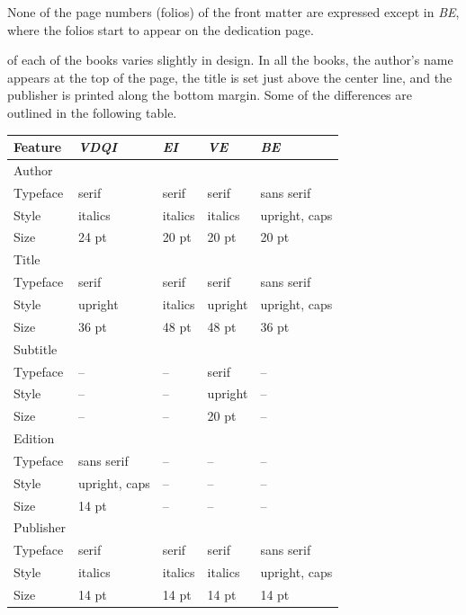 \documentclass[
  twoside,
  symmetric]{tufte-book}
\newcommand{\vdqi}{\textit{VDQI}\xspace}
\newcommand{\ei}{\textit{EI}\xspace}
\newcommand{\ve}{\textit{VE}\xspace}
\newcommand{\be}{\textit{BE}\xspace}
\newcommand{\na}{\quad--}
\begin{document}
None of the page numbers (folios) of the front matter are expressed
except in \be, where the folios start to appear on the dedication page.

 of each of the books varies slightly in
design. In all the books, the author's name appears at the top of the
page, the title is set just above the center line, and the publisher is
printed along the bottom margin. Some of the differences are outlined in
the following table.

\bigskip
\begin{center}
\footnotesize
\begin{tabular}{lllll}
\toprule
Feature & \vdqi & \ei & \ve & \be \\
\midrule
Author & & & & \\
\quad Typeface & serif   & serif   & serif   & sans serif \\
\quad Style    & italics & italics & italics & upright, caps \\
\quad Size     & 24 pt   & 20 pt   & 20 pt   & 20 pt \\
\addlinespace
Title & & & & \\
\quad Typeface & serif   & serif   & serif   & sans serif \\
\quad Style    & upright & italics & upright & upright, caps \\
\quad Size     & 36 pt   & 48 pt   & 48 pt   & 36 pt \\
\addlinespace
Subtitle & & & & \\
\quad Typeface & \na     & \na     & serif   & \na \\
\quad Style    & \na     & \na     & upright & \na \\
\quad Size     & \na     & \na     & 20 pt   & \na \\
\addlinespace
Edition & & & & \\
\quad Typeface & sans serif    & \na  & \na  & \na \\
\quad Style    & upright, caps & \na  & \na  & \na \\
\quad Size     & 14 pt         & \na  & \na  & \na \\
\addlinespace
Publisher & & & & \\
\quad Typeface & serif   & serif   & serif   & sans serif \\
\quad Style    & italics & italics & italics & upright, caps \\
\quad Size     & 14 pt   & 14 pt   & 14 pt   & 14 pt \\
\bottomrule
\end{tabular}
\end{center}
\end{document}
